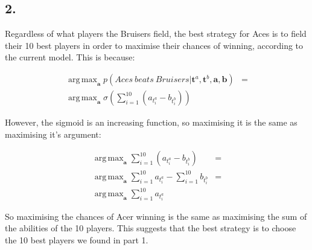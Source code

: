 \documentclass[11pt,a4paper,oneside]{report}
\DeclareMathOperator*{\argmax}{arg\,max}
\begin{document}
\subsection*{2.}

Regardless of what players the Bruisers field, the best strategy for Aces is to field their 10 best players in order to maximise their chances of winning, according to the current model. This is because:

\begin{align}
  \argmax_{\textbf{a}} p(Aces\ beats\ Bruisers | \textbf{t}^a, \textbf{t}^b, \textbf{a}, \textbf{b}) &=\\
  \argmax_{\textbf{a}} \sigma \left( \sum_{i=1}^{10}\left( a_{t_i^a}-b_{t_i^b} \right) \right)
\end{align}

However, the sigmoid is an increasing function, so maximising it is the same as maximising it's argument:

\begin{align}
 \argmax_{\textbf{a}} \sum_{i=1}^{10}\left( a_{t_i^a}-b_{t_i^b} \right) &=\\
  \argmax_{\textbf{a}} \sum_{i=1}^{10} a_{t_i^a} -  \sum_{i=1}^{10}b_{t_i^b} &=\\
  \argmax_{\textbf{a}}  \sum_{i=1}^{10} a_{t_i^a}
\end{align}

So maximising the chances of Acer winning is the same as maximising the sum of the abilities of the 10 players. This suggests that the best strategy is to choose the 10 best players we found in part 1.
\end{document}
